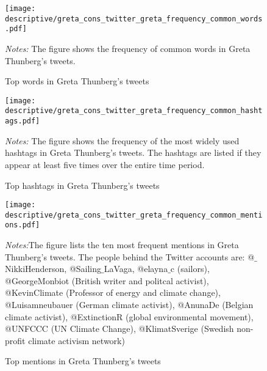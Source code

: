 \documentclass[11pt, a4paper]{article} %
\begin{document}
\begin{figure}[H]\centering
	\caption{Top words in Greta Thunberg's tweets}
	\texttt{[image: descriptive/greta\_cons\_twitter\_greta\_frequency\_common\_words.pdf]}
	\begin{minipage}{\linewidth}
		\scriptsize{\emph{Notes:} The figure shows the frequency of common words in Greta Thunberg's tweets.}
	\end{minipage}
\end{figure}


\begin{figure}[H]\centering
	\caption{Top hashtags in Greta Thunberg's tweets}
	\texttt{[image: descriptive/greta\_cons\_twitter\_greta\_frequency\_common\_hashtags.pdf]}
	\begin{minipage}{\linewidth}
		\scriptsize{\emph{Notes:} The figure shows the frequency of the most widely used hashtags in Greta Thunberg's tweets. The hashtags are listed if they appear at least five times over the entire time period. }
	\end{minipage}
\end{figure}


\begin{figure}[H]\centering
	\caption{Top mentions in Greta Thunberg's tweets}
	\texttt{[image: descriptive/greta\_cons\_twitter\_greta\_frequency\_common\_mentions.pdf]}
	\begin{minipage}{\linewidth}
		\scriptsize{\emph{Notes:}The figure lists the ten most frequent mentions in Greta Thunberg's tweets. The people behind the Twitter accounts are: @$\_$NikkiHenderson, @Sailing$\_$LaVaga, @elayna$\_$c (sailors), @GeorgeMonbiot (British writer and politcal activist),  @KevinClimate (Professor of energy and climate change), @Luisamneubauer (German climate activist), @AnunaDe (Belgian climate activist), @ExtinctionR (global environmental movement), @UNFCCC (UN Climate Change), @KlimatSverige (Swedish non-profit climate activism network)}
	\end{minipage}
\end{figure}
\end{document}
